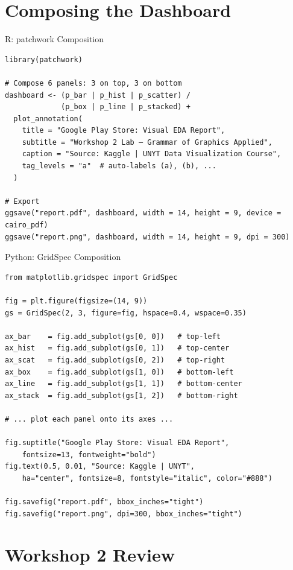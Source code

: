 \documentclass[10pt]{beamer}
\begin{document}
\section{Composing the Dashboard}

\begin{frame}[fragile]{R: patchwork Composition}
\begin{lstlisting}[style=rstyle]
library(patchwork)

# Compose 6 panels: 3 on top, 3 on bottom
dashboard <- (p_bar | p_hist | p_scatter) /
             (p_box | p_line | p_stacked) +
  plot_annotation(
    title = "Google Play Store: Visual EDA Report",
    subtitle = "Workshop 2 Lab — Grammar of Graphics Applied",
    caption = "Source: Kaggle | UNYT Data Visualization Course",
    tag_levels = "a"  # auto-labels (a), (b), ...
  )

# Export
ggsave("report.pdf", dashboard, width = 14, height = 9, device = cairo_pdf)
ggsave("report.png", dashboard, width = 14, height = 9, dpi = 300)
\end{lstlisting}
\end{frame}

\begin{frame}[fragile]{Python: GridSpec Composition}
\begin{lstlisting}[style=pythonstyle]
from matplotlib.gridspec import GridSpec

fig = plt.figure(figsize=(14, 9))
gs = GridSpec(2, 3, figure=fig, hspace=0.4, wspace=0.35)

ax_bar    = fig.add_subplot(gs[0, 0])   # top-left
ax_hist   = fig.add_subplot(gs[0, 1])   # top-center
ax_scat   = fig.add_subplot(gs[0, 2])   # top-right
ax_box    = fig.add_subplot(gs[1, 0])   # bottom-left
ax_line   = fig.add_subplot(gs[1, 1])   # bottom-center
ax_stack  = fig.add_subplot(gs[1, 2])   # bottom-right

# ... plot each panel onto its axes ...

fig.suptitle("Google Play Store: Visual EDA Report",
    fontsize=13, fontweight="bold")
fig.text(0.5, 0.01, "Source: Kaggle | UNYT",
    ha="center", fontsize=8, fontstyle="italic", color="#888")

fig.savefig("report.pdf", bbox_inches="tight")
fig.savefig("report.png", dpi=300, bbox_inches="tight")
\end{lstlisting}
\end{frame}

\section{Workshop 2 Review}
\end{document}
